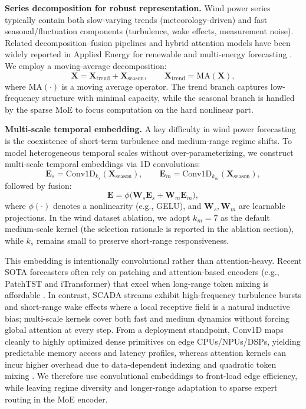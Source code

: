 \documentclass[review,3p,times]{elsarticle}
\begin{document}
\noindent\textbf{Series decomposition for robust representation.} 
Wind power series typically contain both slow-varying trends (meteorology-driven) and fast seasonal/fluctuation components (turbulence, wake effects, measurement noise). Related decomposition--fusion pipelines and hybrid attention models have been widely reported in Applied Energy for renewable and multi-energy forecasting \cite{li2023novel,ma2022hybrid}. We employ a moving-average decomposition:
\begin{equation}
\mathbf{X} = \mathbf{X}_{\text{trend}} + \mathbf{X}_{\text{season}}, \qquad 
\mathbf{X}_{\text{trend}} = \text{MA}(\mathbf{X}),
\end{equation}
where $\text{MA}(\cdot)$ is a moving average operator. The trend branch captures low-frequency structure with minimal capacity, while the seasonal branch is handled by the sparse MoE to focus computation on the hard nonlinear part.


\noindent\textbf{Multi-scale temporal embedding.}\label{sec:embedding}
A key difficulty in wind power forecasting is the coexistence of short-term turbulence and medium-range regime shifts. To model heterogeneous temporal scales without over-parameterizing, we construct multi-scale temporal embeddings via 1D convolutions:
\begin{equation}
\mathbf{E}_s = \text{Conv1D}_{k_s}(\mathbf{X}_{\text{season}}), \qquad
\mathbf{E}_m = \text{Conv1D}_{k_m}(\mathbf{X}_{\text{season}}),
\end{equation}
followed by fusion:
\begin{equation}
\mathbf{E} = \phi\big(\mathbf{W}_s\mathbf{E}_s + \mathbf{W}_m\mathbf{E}_m\big),
\end{equation}
where $\phi(\cdot)$ denotes a nonlinearity (e.g., GELU), and $\mathbf{W}_s,\mathbf{W}_m$ are learnable projections. In the wind dataset ablation, we adopt $k_m=7$ as the default medium-scale kernel (the selection rationale is reported in the ablation section), while $k_s$ remains small to preserve short-range responsiveness.

This embedding is intentionally convolutional rather than attention-heavy. Recent SOTA forecasters often rely on patching and attention-based encoders (e.g., PatchTST and iTransformer) that excel when long-range token mixing is affordable \cite{nie2023patchtst,liu2024itransformer}. In contrast, SCADA streams exhibit high-frequency turbulence bursts and short-range wake effects where a local receptive field is a natural inductive bias; multi-scale kernels cover both fast and medium dynamics without forcing global attention at every step. From a deployment standpoint, Conv1D maps cleanly to highly optimized dense primitives on edge CPUs/NPUs/DSPs, yielding predictable memory access and latency profiles, whereas attention kernels can incur higher overhead due to data-dependent indexing and quadratic token mixing \cite{zhou2019edge,strubell2019energy,schwartz2020greenai}. We therefore use convolutional embeddings to front-load edge efficiency, while leaving regime diversity and longer-range adaptation to sparse expert routing in the MoE encoder.
\end{document}
